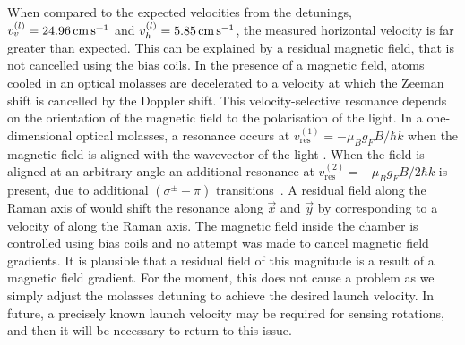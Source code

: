 \par\noindent
When compared to the expected velocities from the detunings,
\(v^{(l)}_v = \sivalue{24.96}{\centi\metre\per\second}\) and
\(v^{(l)}_h = \sivalue{5.85}{\centi\metre\per\second}\), the measured
horizontal velocity is far greater than expected. This can be
explained by a residual magnetic field, that is not cancelled using
the bias coils. In the presence of a magnetic field, atoms cooled in
an optical molasses are decelerated to a velocity at which the Zeeman
shift is cancelled by the Doppler shift. This velocity-selective
resonance depends on the
orientation of the magnetic field to the polarisation of the light. In
a one-dimensional optical molasses, a resonance occurs at
\(v_\text{res}^{(1)} = - \mu_B g_F B/\hbar k\) when the magnetic field
is aligned with the wavevector of the light \cite{VanderStraten1993}.
When the field is aligned at an arbitrary angle an additional
resonance at \(v_\text{res}^{(2)} = - \mu_B g_F B/2\hbar k\) is
present, due to additional \(\left(\sigma^{\pm}-\pi\right)\)
transitions~\cite{Chang2002,Walhout1992}. A residual field along the Raman axis of
 would shift the resonance along \(\vec{x}\)
and \(\vec{y}\) by 
corresponding to a velocity of 
along the Raman axis. The magnetic field inside the chamber is
controlled using bias coils and no attempt was made to cancel magnetic
field gradients. It is plausible that a residual field of this
magnitude is a result of a magnetic field gradient. For the moment,
this does not cause a problem as we simply adjust the molasses
detuning to achieve the desired launch velocity. In future, a
precisely known launch velocity may be required for sensing rotations,
and then it will be necessary to return to this issue.

